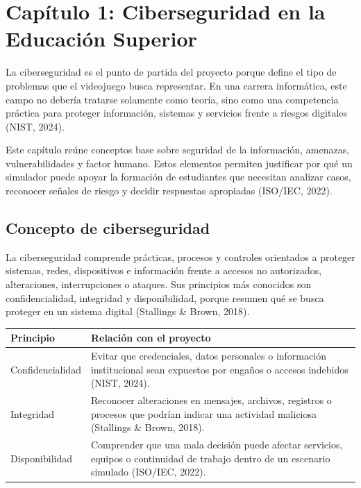 \section[Capítulo 1: Ciberseguridad en la Educación Superior]{\centering Capítulo 1: Ciberseguridad en la Educación Superior}

La ciberseguridad es el punto de partida del proyecto porque define el tipo de problemas que el videojuego busca representar. En una carrera informática, este campo no debería tratarse solamente como teoría, sino como una competencia práctica para proteger información, sistemas y servicios frente a riesgos digitales (NIST, 2024).

Este capítulo reúne conceptos base sobre seguridad de la información, amenazas, vulnerabilidades y factor humano. Estos elementos permiten justificar por qué un simulador puede apoyar la formación de estudiantes que necesitan analizar casos, reconocer señales de riesgo y decidir respuestas apropiadas (ISO/IEC, 2022).

\subsection{Concepto de ciberseguridad}

La ciberseguridad comprende prácticas, procesos y controles orientados a proteger sistemas, redes, dispositivos e información frente a accesos no autorizados, alteraciones, interrupciones o ataques. Sus principios más conocidos son confidencialidad, integridad y disponibilidad, porque resumen qué se busca proteger en un sistema digital (Stallings \& Brown, 2018).

\begin{longtable}{|p{}|p{}|}
\hline
\textbf{Principio} & \textbf{Relación con el proyecto} \\
\hline
Confidencialidad & Evitar que credenciales, datos personales o información institucional sean expuestos por engaños o accesos indebidos (NIST, 2024). \\
\hline
Integridad & Reconocer alteraciones en mensajes, archivos, registros o procesos que podrían indicar una actividad maliciosa (Stallings \& Brown, 2018). \\
\hline
Disponibilidad & Comprender que una mala decisión puede afectar servicios, equipos o continuidad de trabajo dentro de un escenario simulado (ISO/IEC, 2022). \\
\hline
\end{longtable}

